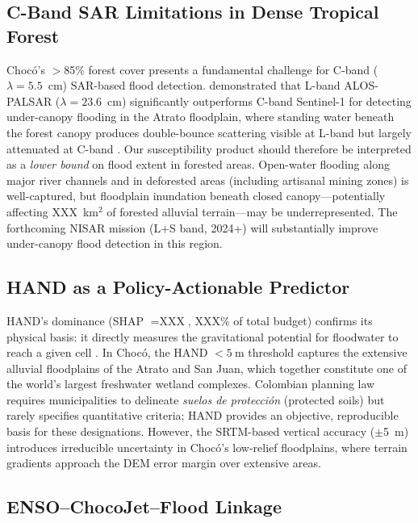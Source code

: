 \documentclass{article}
\begin{document}
\subsection{C-Band SAR Limitations in Dense Tropical Forest}

Choc\'o's $>$85\% forest cover presents a fundamental challenge for C-band ($\lambda = 5.5$~cm) SAR-based flood detection. \citet{PalominoAngel2019} demonstrated that L-band ALOS-PALSAR ($\lambda = 23.6$~cm) significantly outperforms C-band Sentinel-1 for detecting under-canopy flooding in the Atrato floodplain, where standing water beneath the forest canopy produces double-bounce scattering visible at L-band but largely attenuated at C-band \citep{AnayaAcevedo2020}. Our susceptibility product should therefore be interpreted as a \textit{lower bound} on flood extent in forested areas. Open-water flooding along major river channels and in deforested areas (including artisanal mining zones) is well-captured, but floodplain inundation beneath closed canopy---potentially affecting XXX~km$^2$ of forested alluvial terrain---may be underrepresented. The forthcoming NISAR mission (L+S band, 2024+) will substantially improve under-canopy flood detection in this region.

\subsection{HAND as a Policy-Actionable Predictor}

HAND's dominance (SHAP $= \text{XXX}$, XXX\% of total budget) confirms its physical basis: it directly measures the gravitational potential for floodwater to reach a given cell \citep{Renno2008, Nobre2011}. In Choc\'o, the HAND $< \SI{5}{\metre}$ threshold captures the extensive alluvial floodplains of the Atrato and San Juan, which together constitute one of the world's largest freshwater wetland complexes. Colombian planning law requires municipalities to delineate \textit{suelos de protecci\'on} (protected soils) but rarely specifies quantitative criteria; HAND provides an objective, reproducible basis for these designations. However, the SRTM-based vertical accuracy ($\pm$\SI{5}{\metre}) introduces irreducible uncertainty in Choc\'o's low-relief floodplains, where terrain gradients approach the DEM error margin over extensive areas.

\subsection{ENSO--ChocoJet--Flood Linkage}
\end{document}
